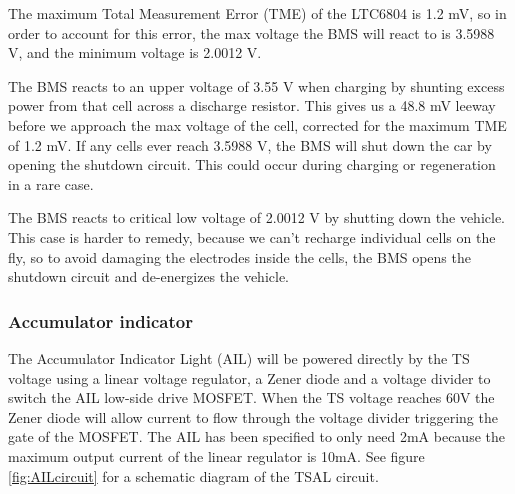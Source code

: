 \documentclass{article}
\begin{document}
The maximum Total Measurement Error (TME) of the LTC6804 is 1.2 mV, so in order to account for this error, the max voltage the BMS will react to is 3.5988 V, and the minimum voltage is 2.0012 V. 

The BMS reacts to an upper voltage of 3.55 V when charging by shunting excess power from that cell across a discharge resistor. This gives us a 48.8 mV leeway before we approach the max voltage of the cell, corrected for the maximum TME of 1.2 mV. If any cells ever reach 3.5988 V, the BMS will shut down the car by opening the shutdown circuit. This could occur during charging or regeneration in a rare case. 

The BMS reacts to critical low voltage of 2.0012 V by shutting down the vehicle. This case is harder to remedy, because we can't recharge individual cells on the fly, so to avoid damaging the electrodes inside the cells, the BMS opens the shutdown circuit and de-energizes the vehicle. 

\subsubsection{Accumulator indicator}\label{accumulator_indicator}
The Accumulator Indicator Light (AIL) will be powered directly by the TS voltage using a linear voltage regulator, a Zener diode and a voltage divider to switch the AIL low-side drive MOSFET. When the TS voltage reaches 60V the Zener diode will allow current to flow through the voltage divider triggering the gate of the MOSFET. The AIL has been specified to only need 2mA because the maximum output current of the linear regulator is 10mA. See figure \ref{fig:AILcircuit} for a schematic diagram of the TSAL circuit.
\\
\end{document}
